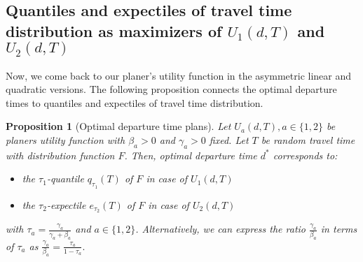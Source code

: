 \documentclass[
]{article}
\newtheorem{proposition}{Proposition}[section]
\theoremstyle{definition}
\theoremstyle{definition}
\theoremstyle{definition}
\theoremstyle{definition}
\theoremstyle{remark}
\begin{document}
\hypertarget{quantiles-and-expectiles-of-travel-time-distribution-as-maximizers-of-u_1dt-and-u_2dt}{%
\subsection{\texorpdfstring{Quantiles and expectiles of travel time distribution as maximizers of \(U_1(d,T)\) and \(U_2(d,T)\)}{Quantiles and expectiles of travel time distribution as maximizers of U\_1(d,T) and U\_2(d,T)}}\label{quantiles-and-expectiles-of-travel-time-distribution-as-maximizers-of-u_1dt-and-u_2dt}}

Now, we come back to our planer's utility function in the asymmetric linear and quadratic versions. The following proposition connects the optimal departure times to quantiles and expectiles of travel time distribution.

\begin{proposition}[Optimal departure time plans]
\protect\hypertarget{prp:proputil}{}\label{prp:proputil}Let \(U_a(d,T), a\in\{1,2\}\) be planers utility function with \(\beta_a>0\) and \(\gamma_a>0\) fixed. Let \(T\) be random travel time with distribution function \(F\). Then, optimal departure time \(d^*\) corresponds to:

\begin{itemize}
\item
  the \(\tau_1\)-quantile \(q_{\tau_1}(T)\) of \(F\) in case of \(U_1(d,T)\)
\item
  the \(\tau_2\)-expectile \(e_{\tau_2}(T)\) of \(F\) in case of \(U_2(d,T)\)
\end{itemize}

with \(\tau_a=\frac{\gamma_a}{\gamma_a+\beta_a}\) and \(a\in\{1,2\}\). Alternatively, we can express the ratio \(\frac{\gamma_a}{\beta_a}\) in terms of \(\tau_a\) as \(\frac{\gamma_a}{\beta_a} = \frac{\tau_a}{1-\tau_a}.\)
\end{proposition}
\end{document}
